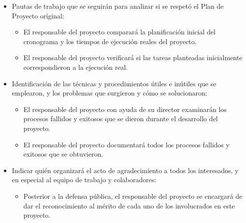 \documentclass[
11pt, %
codirector, %
]{charter}
\begin{document}
\begin{itemize}
	\item Pautas de trabajo que se seguirán para analizar si se respetó el Plan de Proyecto original:
	
	 \begin{itemize}
	 \item El responsable del proyecto comparará la planificación inicial del cronograma y los tiempos de ejecución reales del proyecto.
	 
	 \item El responsable del proyecto verificará si las tareas planteadas inicialmente correspondieron a la ejecución real.
	  \end{itemize}
	\item Identificación de las técnicas y procedimientos útiles e inútiles que se emplearon, y los problemas que surgieron y cómo se solucionaron:
	
	 \begin{itemize}
	 \item El responsable del proyecto con ayuda de su director examinarán los procesos fallidos y exitosos que se dieron durante el desarrollo del proyecto.
	 
	  \item El responsable del proyecto documentará todos los procesos fallidos y exitosos que se obtuvieron. 
	  
	  \end{itemize}
	\item Indicar quién organizará el acto de agradecimiento a todos los interesados, y en especial al equipo de trabajo y colaboradores:
	
	  \begin{itemize}
	 \item Posterior a la defensa pública, el responsable del proyecto se encargará de dar el reconocimiento al mérito de cada uno de los involucrados en este proyecto.
	 
	  \end{itemize}
\end{itemize}
\end{document}
